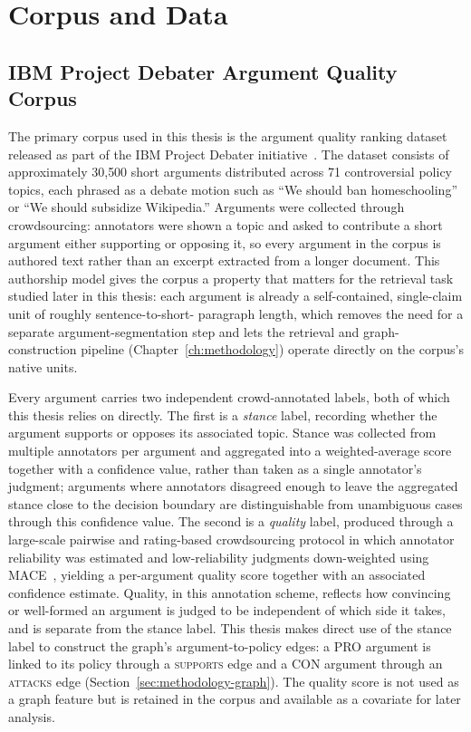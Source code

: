\chapter{Corpus and Data}
\label{ch:corpus}

\section{IBM Project Debater Argument Quality Corpus}
\label{sec:corpus-ibm}

The primary corpus used in this thesis is the argument quality ranking dataset released as part
of the IBM Project Debater initiative~\textcite{gretz2020argq}. The dataset consists of
approximately 30{,}500 short arguments distributed across 71 controversial policy topics, each
phrased as a debate motion such as ``We should ban homeschooling'' or ``We should subsidize
Wikipedia.'' Arguments were collected through crowdsourcing: annotators were shown a topic and
asked to contribute a short argument either supporting or opposing it, so every argument in the
corpus is authored text rather than an excerpt extracted from a longer document. This authorship
model gives the corpus a property that matters for the retrieval task studied later in this
thesis: each argument is already a self-contained, single-claim unit of roughly sentence-to-short-
paragraph length, which removes the need for a separate argument-segmentation step and lets the
retrieval and graph-construction pipeline (Chapter~\ref{ch:methodology}) operate directly on the
corpus's native units.

Every argument carries two independent crowd-annotated labels, both of which this thesis relies
on directly. The first is a \emph{stance} label, recording whether the argument supports or
opposes its associated topic. Stance was collected from multiple annotators per argument and
aggregated into a weighted-average score together with a confidence value, rather than taken as a
single annotator's judgment; arguments where annotators disagreed enough to leave the aggregated
stance close to the decision boundary are distinguishable from unambiguous cases through this
confidence value. The second is a \emph{quality} label, produced through a large-scale pairwise
and rating-based crowdsourcing protocol in which annotator reliability was estimated and
low-reliability judgments down-weighted using MACE~\cite{hovy2013mace}, yielding a per-argument
quality score together with an associated confidence estimate. Quality, in this annotation
scheme, reflects how convincing or well-formed an argument is judged to be independent of which
side it takes, and is separate from the stance label. This thesis makes direct use of the stance
label to construct the graph's argument-to-policy edges: a PRO argument is linked to its policy
through a \textsc{supports} edge and a CON argument through an \textsc{attacks} edge
(Section~\ref{sec:methodology-graph}). The quality score is not used as a graph feature but is
retained in the corpus and available as a covariate for later analysis.


